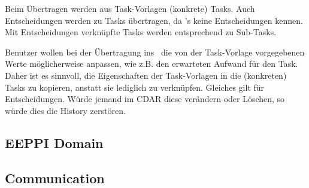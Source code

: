 				Beim Übertragen werden aus Task-Vorlagen (konkrete) Tasks.
				Auch Entscheidungen werden zu Tasks übertragen, da \ppt's keine Entscheidungen kennen.
				Mit Entscheidungen verknüpfte Tasks werden entsprechend zu Sub-Tasks.
				
				Benutzer wollen bei der Übertragung ins \ppt\ die von der Task-Vorlage vorgegebenen Werte möglicherweise anpassen, wie z.B. den erwarteten Aufwand für den Task.
				Daher ist es sinnvoll, die Eigenschaften der Task-Vorlagen in die (konkreten) Tasks zu kopieren, anstatt sie lediglich zu verknüpfen.
				Gleiches gilt für Entscheidungen. Würde jemand im CDAR diese verändern oder Löschen, so würde dies die History zerstören.
			
		
		\subsection{EEPPI Domain}
			
				
		
		\subsection{Communication}